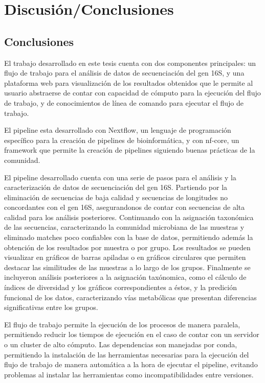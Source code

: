\chapter{Discusión/Conclusiones}
\section{Conclusiones}
El trabajo desarrollado en este tesis cuenta con dos componentes principales: un flujo de trabajo para el análisis de datos de secuenciación del gen 16S, y una plataforma web para visualización de los resultados obtenidos que le permite al usuario abstraerse de contar con capacidad de cómputo para la ejecución del flujo de trabajo, y de conocimientos de línea de comando para ejecutar el flujo de trabajo.

El pipeline esta desarrollado con Nextflow, un lenguaje de programación específico para la creación de pipelines de bioinformática, y con nf-core, un framework que permite la creación de pipelines siguiendo buenas prácticas de la comunidad. 

El pipeline desarrollado cuenta con una serie de pasos para el análisis y la caracterización de datos de secuenciación del gen 16S. Partiendo por la eliminación de secuencias de baja calidad y secuencias de longitudes no concordantes con el gen 16S, asegurandonos de contar con secuencias de alta calidad para los análisis posteriores.
Continuando con la asignación taxonómica de las secuencias, caracterizando la comunidad microbiana de las muestras y eliminado matches poco confiables con la base de datos, permitiendo además la obtención de los resultados por muestra o por grupo.
Los resultados se pueden visualizar en gráficos de barras apiladas o en gráficos circulares que permiten destacar las similitudes de las muestras a lo largo de los grupos.
Finalmente se incluyeron análisis posteriores a la asignación taxónomica, como el cálculo de índices de diversidad y los gráficos correspondientes a éstos, y la predición funcional de los datos, caracterizando vías metabólicas que presentan diferencias significativas entre los grupos.

El flujo de trabajo permite la ejecución de los procesos de manera paralela, permitiendo reducir los tiempos de ejecución en el caso de contar con un servidor o un cluster de alto cómputo.
Las dependencias son manejadas por conda, permitiendo la instalación de las herramientas necesarias para la ejecución del flujo de trabajo de manera automática a la hora de ejecutar el pipeline, evitando problemas al instalar las herramientas como incompatibilidades entre versiones.

